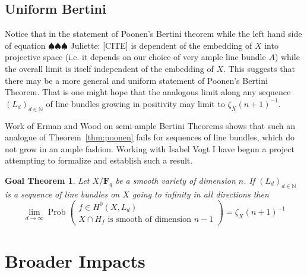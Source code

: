 \documentclass[10pt,reqno]{amsart}
\newtheorem{goalTheorem}[lemma]{Goal Theorem}
\theoremstyle{remark}
\newcommand{\Prob}{\operatorname{Prob}}
\newcommand{\fF}{\mathbf F}
\newcommand{\N}{\mathbb{N}}
\newcommand{\juliette}[1]{{\color{red} \sf $\spadesuit\spadesuit\spadesuit$ Juliette: [#1]}}
\begin{document}
\subsection{Uniform Bertini}

Notice that in the statement of Poonen's Bertini theorem while the left hand side of equation \juliette{CITE} is dependent of the embedding of $X$ into projective space (i.e. it depends on our choice of very ample line bundle $A$) while the overall limit is itself independent of the embedding of $X$. This suggests that there may be a more general and uniform statement of Poonen's Bertini Theorem. That is one might hope that the analogous limit along any sequence $(L_{d})_{d\in\N}$ of line bundles growing in positivity may limit to $\zeta_{X}(n+1)^{-1}$.

Work of Erman and Wood on semi-ample Bertini Theorems shows that such an analogue of Theorem~\ref{thm:poonen} fails for sequences of line bundles, which do not grow in an ample fashion. Working with Isabel Vogt I have begun a project attempting to formalize and establish such a result. 

 
\begin{goalTheorem}
Let $X/\fF_{q}$ be a smooth variety of dimension $n$. If $\left(L_{d}\right)_{d\in\N}$ is a sequence of line bundles on $X$ going to infinity in all directions then 
\begin{equation}
\lim_{d\to \infty} \Prob\left(\begin{matrix} f\in H^0\left(X, L_{d}\right) \\ \text{$X\cap H_{f}$ is smooth of dimension $n-1$}\end{matrix}\right)=
\zeta_X(n+1)^{-1} 
\end{equation}
\end{goalTheorem}


\newpage 

\section{Broader Impacts}
\end{document}
